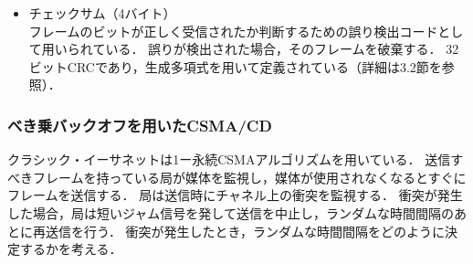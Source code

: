 \documentclass[a4paper]{ltjsarticle}
\providecommand{\tightlist}{%
  \setlength{\itemsep}{0pt}\setlength{\parskip}{0pt}}
\begin{document}
\begin{itemize}
\begin{itemize}
    \begin{itemize}
    \tightlist
    \item
      衝突を検知したとき，送信中のフレームの送信は打ち切られるため，バラバラとなったビットとフレームのかけらがいくつもケーブル上に存在してしまう．
      もしデータが極端に短いフレームが送信されると，これらと見分けがつきにくい．
    \item
      送信した最初のビットがケーブルの終端へ到着する前にフレームの送信が終了してしまうと，送信側が衝突を検知する前に送信が正常に終了したと誤認する恐れがある．
      そのため，衝突を検知したときにフレームを送信しておくためには，送信時間を終端までの遅延時間の2倍以上とする必要がある．
    \end{itemize}
  \item
    パッド\\
    フレームが終端に到着する遅延時間を\(\tau\)とする．
    上記より，すべてのフレームは送信に\(2\tau\)以上の時間をかけなければならない．
    \SI{2.5}{km}の最長距離と4つのリピータを持つ約10Mビット/秒のLANでは，リピータの遅延時間を含めラウンド・トリップ時間は最悪の場合で約\SI{50}{\micro s}と算出される．
    1ビットの転送に\SI{100}{\nano s}かかるため，最小のフレーム長は500ビットとなる．
    いくらかの余裕を付加して，512ビット（64バイト）に丸められる．
    データフィールドまでのフィールドの長さを合計すると，22バイトであるため，差し引き46バイト必要である．
    よって，データフィールドが46バイト未満であるとき，不足分をパッドフィールドで埋め合わせる．
  \end{itemize}
\item
  チェックサム（4バイト）\\
  フレームのビットが正しく受信されたか判断するための誤り検出コードとして用いられている．
  誤りが検出された場合，そのフレームを破棄する．
  32ビットCRCであり，生成多項式を用いて定義されている（詳細は3.2節を参照）．
\end{itemize}

\subsubsection{べき乗バックオフを用いたCSMA/CD}\label{ux3079ux304dux4e57ux30d0ux30c3ux30afux30aaux30d5ux3092ux7528ux3044ux305fcsmacd}

クラシック・イーサネットは1ー永続CSMAアルゴリズムを用いている．
送信すべきフレームを持っている局が媒体を監視し，媒体が使用されなくなるとすぐにフレームを送信する．
局は送信時にチャネル上の衝突を監視する．
衝突が発生した場合，局は短いジャム信号を発して送信を中止し，ランダムな時間間隔のあとに再送信を行う．
衝突が発生したとき，ランダムな時間間隔をどのように決定するかを考える．
\end{document}

